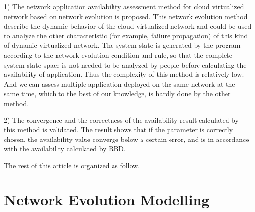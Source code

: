 \documentclass[journal]{IEEEtran}
\begin{document}
    1) The network application availability assessment method for cloud virtualized network based on network evolution is proposed. This network evolution method 
    describe the dynamic behavior of the cloud virtualized network and could be used to analyze the other characteristic (for example, failure propagation) of this kind of dynamic virtualized network. The system state is generated by the program according to the network evolution condition and rule, so that the complete system state space is not needed to be analyzed by people before calculating the availability of application. Thus the complexity of this method is 
    relatively low. And we can assess multiple application deployed on the same network at the same time, which to the best of our knowledge, is hardly done by the other method.
    
    2) The convergence and the correctness of the availability result calculated by this method is validated. The result shows that if the parameter is correctly chosen, the availability value converge below a certain error, and is in accordance with the availability calculated by RBD.
    
    
    
    


%
    
    The rest of this article is organized as follow.


    \section{Network Evolution Modelling}
    
\end{document}
